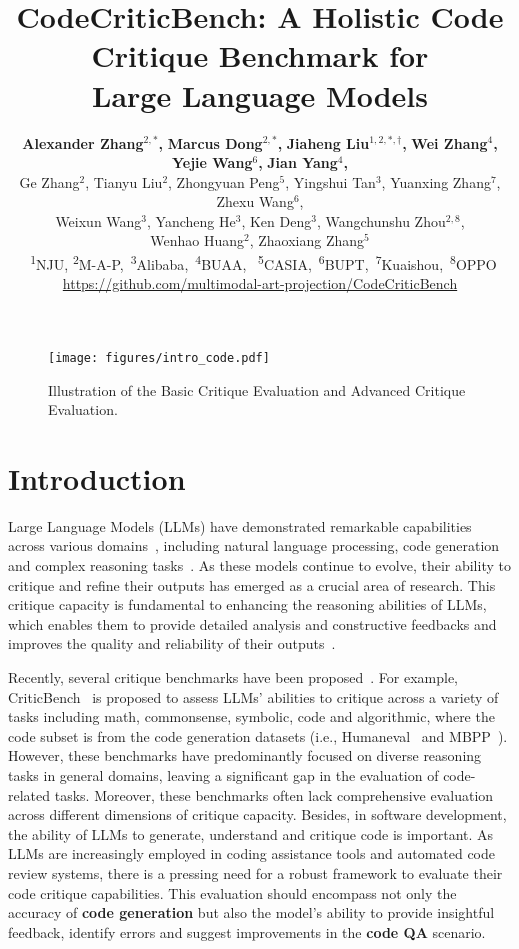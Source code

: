 \documentclass[11pt, a4paper, logo, copyright, nonumbering, amsart]{map}
\title{
    \centering CodeCriticBench: A Holistic Code Critique Benchmark for\\Large Language Models
    \vspace{-0.2in}
}
\author{
            \vspace{-0.1in}
    \textbf{Alexander Zhang$^{2,\ast}$,}
    \textbf{Marcus Dong$^{2,\ast}$,}
    \textbf{Jiaheng Liu$^{1, 2, \ast, \dagger}$,}
    \textbf{Wei Zhang$^{4}$,}
    \textbf{Yejie Wang$^{6}$,}
    \textbf{Jian Yang$^{4}$,}\\
    Ge Zhang$^{2}$,
    Tianyu Liu$^{2}$,
    Zhongyuan Peng$^{5}$,
    Yingshui Tan$^{3}$,
    Yuanxing Zhang$^{7}$,
    Zhexu Wang$^{6}$,\\
    Weixun Wang$^{3}$,
    Yancheng He$^{3}$,
    Ken Deng$^{3}$,
    Wangchunshu Zhou$^{2,8}$,\\
    Wenhao Huang$^{2}$,
    Zhaoxiang Zhang$^{5}$
    \\
        \vspace{0.1in}
    ~\textsuperscript{\rm 1}{NJU}, \textsuperscript{\rm 2}{M-A-P},~\textsuperscript{\rm 3}{Alibaba},~\textsuperscript{\rm 4}{BUAA}, ~\textsuperscript{\rm 5}{CASIA},~\textsuperscript{\rm 6}{BUPT},~\textsuperscript{\rm 7}{Kuaishou},~\textsuperscript{\rm 8}{OPPO}
    \vspace{-0.1in}

\url{https://github.com/multimodal-art-projection/CodeCriticBench}
    \vspace{-0.2in}
}
\begin{document}
\begin{CJK*}{UTF8}{gbsn}

\maketitle

\let\oldthefootnote\thefootnote

\let\thefootnote\relax{}
\let\thefootnote\oldthefootnote

\begin{figure*}[h]
    \centering
    \texttt{[image: figures/intro\_code.pdf]}
    \caption{Illustration of the Basic Critique Evaluation and Advanced Critique Evaluation.} \label{fig:intro}
\end{figure*}

\clearpage

\tableofcontents

\clearpage

\section{Introduction} 

Large Language Models (LLMs) have demonstrated remarkable capabilities across various domains~\citep{dubey2024llama3,touvron2023llama,rozire2023codellama}, including natural language processing, code generation and complex reasoning tasks~\citep{wang2025mtubench,liu2024roleagent,liu-etal-2024-e2,bai2024mt}. As these models continue to evolve, their ability to critique and refine their outputs has emerged as a crucial area of research. This critique capacity is fundamental to enhancing the reasoning abilities of LLMs, which enables them to provide detailed analysis and constructive feedbacks and improves the quality and reliability of their outputs~\citep{madaan2023selfrefine,Song2025ProgCoPH}.

Recently, several critique benchmarks have been proposed~\citep{lan2024criticeval,lin2024criticbench,judgebench,prmbench,Zheng2024ProcessBenchIP,tang2025real}. For example, CriticBench~\citep{zheng2024critic} is proposed to assess LLMs' abilities to critique across a variety of tasks including math, commonsense, symbolic, code and algorithmic,
where the code subset is from the code generation datasets (i.e., Humaneval~\citep{chen2021evaluatinglargelanguagemodels} and MBPP~\citep{mbpp}). However, these benchmarks have predominantly focused on diverse reasoning tasks in general domains, leaving a significant gap in the evaluation of code-related tasks. Moreover, these benchmarks often lack comprehensive evaluation across different dimensions of critique capacity. Besides, in software development, the ability of LLMs to generate, understand and critique code is important. As LLMs are increasingly employed in coding assistance tools and automated code review systems, there is a pressing need for a robust framework to evaluate their code critique capabilities. This evaluation should encompass not only the accuracy of \textbf{code generation} but also the model's ability to provide insightful feedback, identify errors and suggest improvements in the \textbf{code QA} scenario.


\end{CJK*}
\end{document}
